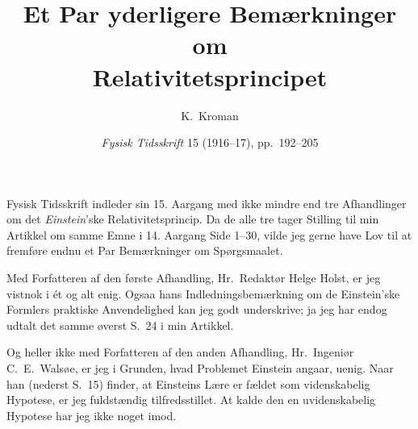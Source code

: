 \documentclass[12pt,a4paper]{article}
\title{\textbf{\textbf{Et Par yderligere Bemærkninger om}\\[2pt]\guillemotleft Relativitetsprincipet\guillemotright}}
\author{K.\ Kroman}
\date{\textit{Fysisk Tidsskrift} 15 (1916--17), pp.~192--205}
\newcommand{\opage}[1]{\marginnote{\footnotesize\textit{[#1]}}}
\begin{document}
\maketitle

\opage{192} %

Fysisk Tidsskrift indleder sin 15. Aargang med ikke mindre end tre
Afhandlinger om det \emph{Einstein}'ske Relativitetsprincip. Da de alle tre
tager Stilling til min Artikkel om samme Emne i 14. Aargang Side 1--30, vilde
jeg gerne have Lov til at fremføre endnu et Par Bemærkninger om Spørgsmaalet.

Med Forfatteren af den første Afhandling, Hr.\ Redaktør Helge Holst, er jeg
vistnok i ét og alt enig. Ogsaa hans Indledningsbemærkning om de Einstein'ske
Formlers praktiske Anvendelighed kan jeg godt underskrive; ja jeg har endog
udtalt det samme øverst S.\ 24 i min Artikkel.

Og heller ikke med Forfatteren af den anden Afhandling, Hr.\ Ingeniør
C.\ E.\ Walsøe, er jeg i Grunden, hvad Problemet Einstein angaar, uenig. Naar
han (nederst S.\ 15) finder, at Einsteins Lære er fældet som videnskabelig
Hypotese, er jeg fuldstændig tilfredsstillet. At kalde den en uvidenskabelig
Hypotese har jeg ikke noget imod.
\end{document}
